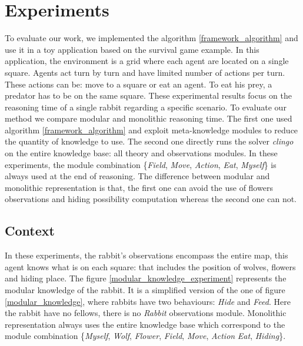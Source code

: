 \documentclass{aamas2012}
\begin{document}
\section{Experiments}

	To evaluate our work, we implemented the algorithm \ref{framework_algorithm} and use it in a toy application based on the survival game example.
	In this application, the environment is a grid where each agent are located on a single square.
	Agents act turn by turn and have limited number of actions per turn.
	These actions can be: move to a square or eat an agent.
	To eat his prey, a predator has to be on the same square.
	These experimental results focus on the reasoning time of a single rabbit regarding a specific scenario.
	To evaluate our method we compare modular and monolithic reasoning time.
	The first one used algorithm \ref{framework_algorithm} and exploit meta-knowledge modules to reduce the quantity of knowledge to use.
	The second one directly runs the solver \emph{clingo} on the entire knowledge base: all theory and observations modules.
	In these experiments, the module combination \{\emph{Field}, \emph{Move}, \emph{Action}, \emph{Eat}, \emph{Myself}\} is always used at the end of reasoning.
	The difference between modular and monolithic representation is that,
	the first one can avoid the use of flowers observations and hiding possibility computation whereas the second one can not.
	
\subsection{Context}
	
	In these experiments, the rabbit's observations encompass the entire map, 
	this agent knows what is on each square: that includes the position of wolves, flowers and hiding place.
	The figure \ref{modular_knowledge_experiment} represents the modular knowledge of the rabbit.
	It is a simplified version of the one of figure \ref{modular_knowledge}, where rabbits have two behaviours: \emph{Hide} and \emph{Feed}.
	Here the rabbit have no fellows, there is no \emph{Rabbit} observations module.
	Monolithic representation always uses the entire knowledge base which correspond to the module combination
	\{\emph{Myself}, \emph{Wolf}, \emph{Flower}, \emph{Field}, \emph{Move}, \emph{Action} \emph{Eat}, \emph{Hiding}\}.
	
\end{document}
